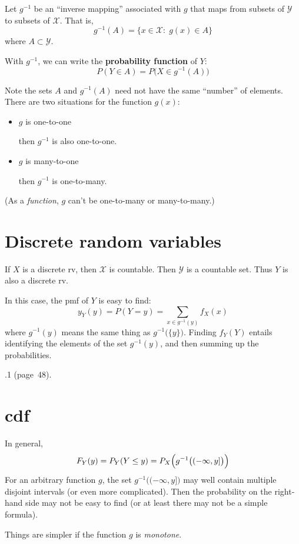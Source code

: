 \documentclass[12pt]{article}
\begin{document}
Let $g^{-1}$ be an ``inverse mapping'' associated with $g$
that maps from subsets of $\mathcal{Y}$ to subsets of $\mathcal{X}$.
That is,
\[
g^{-1}(A) = \{x\in \mathcal{X}:\; g(x) \in A\}
\]
where $A \subset \mathcal{Y}$.

With $g^{-1}$, we can write the \textbf{probability function} of $Y$:
\[
P(Y \in A)
= P\bigl(X \in g^{-1}(A)\bigr)
\]

Note the sets $A$ and $g^{-1}(A)$ need not have the same ``number'' of
elements. There are two situations for the function $g(x)$:
\begin{itemize}
\item
$g$ is one-to-one\\
\strut\hspace{2cm} then $g^{-1}$ is also one-to-one.
\item
$g$ is many-to-one\\
\strut\hspace{2cm} then $g^{-1}$ is one-to-many.
\end{itemize}
(As a \emph{function}, $g$ can't be one-to-many or many-to-many.)

\section{Discrete random variables}

If $X$ is a discrete rv, then $\mathcal{X}$ is countable.
Then $\mathcal{Y}$ is a countable set.
Thus $Y$ is also a discrete rv.

In this case, the pmf of $Y$ is easy to find:
\[
y_Y(y)
= P(Y = y)
= \sum_{x \in g^{-1}(y)} f_X(x)
\]
where $g^{-1}(y)$ means the same thing as
$g^{-1}\bigl(\{y\}\bigr)$.
Finding $f_Y(Y)$ entails identifying the elements of
the set $g^{-1}(y)$, and then summing up the probabilities.


.1 (page~48).

\section{cdf}

In general,
\[
F_Y(y)
= P_Y(Y \le y)
= P_X\Bigl(g^{-1}\bigl((-\infty, y]\bigr)\Bigr)
\]
For an arbitrary function $g$,
the set $g^{-1}\bigl((-\infty, y]\bigr)$
may well contain multiple disjoint intervals (or even more complicated).
Then the probability on the right-hand side may not be easy to find
(or at least there may not be a simple formula).

Things are simpler if the function $g$ is \emph{monotone}.
\end{document}

